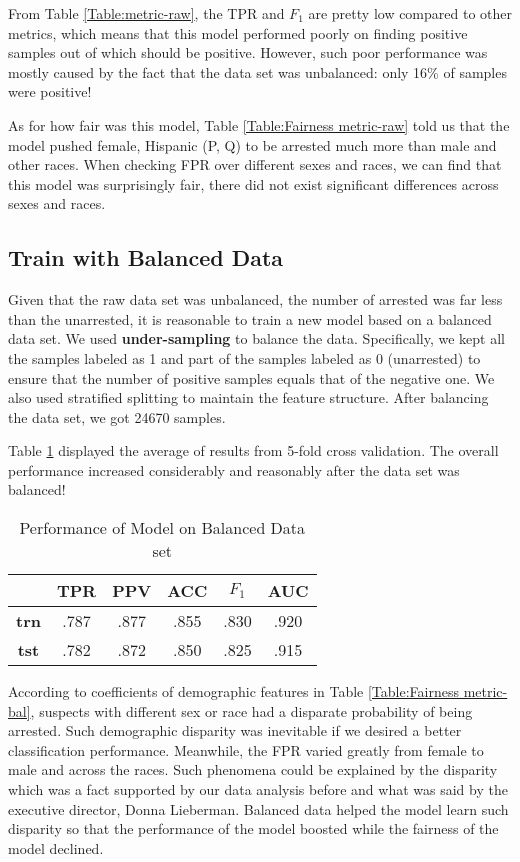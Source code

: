 From Table \ref{Table:metric-raw}, the TPR and $F_1$ are pretty low compared to other metrics, which means that this model performed poorly on finding positive samples out of which should be positive. However, such poor performance was mostly caused by the fact that the data set was unbalanced: only 16\% of samples were positive! 

As for how fair was this model, Table \ref{Table:Fairness metric-raw} told us that the model pushed female, Hispanic (P, Q) to be arrested much more than male and other races. When checking FPR over different sexes and races, we can find that this model was surprisingly fair, there did not exist significant differences across sexes and races.

\subsection{Train with Balanced Data}
Given that the raw data set was unbalanced, the number of arrested was far less than the unarrested, it is reasonable to train a new model based on a balanced data set. We used \textbf{under-sampling} to balance the data. Specifically, we kept all the samples labeled as 1 and part of the samples labeled as 0 (unarrested) to ensure that the number of positive samples equals that of the negative one. We also used stratified splitting to maintain the feature structure. After balancing the data set, we got 24670 samples.

Table \ref{Table:metric metric-bal} displayed the average of results from 5-fold cross validation. The overall performance increased considerably and reasonably after the data set was balanced!


\begin{table}[htb]
    \centering
\begin{tabular}{@{}cccccc@{}}
\hline
             & \textbf{TPR} & \textbf{PPV} & \textbf{ACC} & \textbf{$F_1$} & \textbf{AUC} \\
\hline
\textbf{trn} & .787         & .877         & .855         & .830        & .920         \\
\textbf{tst} & .782         & .872         & .850         & .825        & .915\\ \hline
\end{tabular}
\caption{Performance of Model on Balanced Data set}
    \label{Table:metric metric-bal}
\end{table}

According to coefficients of demographic features in Table \ref{Table:Fairness metric-bal}, suspects with different sex or race had a disparate probability of being arrested. Such demographic disparity was inevitable if we desired a better classification performance. Meanwhile, the FPR varied greatly from female to male and across the races. Such phenomena could be explained by the disparity which was a fact supported by our data analysis before and what was said by the executive director, Donna Lieberman. Balanced data helped the model learn such disparity so that the performance of the model boosted while the fairness of the model declined.

